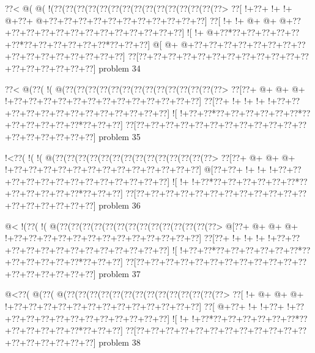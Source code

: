 \vbox{\vbox{\goo
\0??<\- @(\- @(\- !(\0??(\0??(\0??(\0??(\0??(\0??(\0??(\0??(\0??(\0??(\0??(\0??(\0??(\0??(\0??>
\0??[\- !+\0??+\- !+\- !+\- @+\0??+\- @+\0??+\0??+\0??+\0??+\0??+\0??+\0??+\0??+\0??+\0??+\0??]
\0??[\- !+\- !+\- @+\- @+\- @+\0??+\0??+\0??+\0??+\0??+\0??+\0??+\0??+\0??+\0??+\0??+\0??+\0??]
\- ![\- !+\- @+\0??*\0??+\0??+\0??+\0??+\0??+\0??*\0??+\0??+\0??+\0??+\0??+\0??*\0??+\0??+\0??]
\- @[\- @+\- @+\0??+\0??+\0??+\0??+\0??+\0??+\0??+\0??+\0??+\0??+\0??+\0??+\0??+\0??+\0??+\0??]
\0??[\0??+\0??+\0??+\0??+\0??+\0??+\0??+\0??+\0??+\0??+\0??+\0??+\0??+\0??+\0??+\0??+\0??+\0??]
}
\hfil problem 34\hfil\break
}



\vbox{\vbox{\goo
\0??<\- @(\0??(\- !(\- @(\0??(\0??(\0??(\0??(\0??(\0??(\0??(\0??(\0??(\0??(\0??(\0??(\0??(\0??>
\0??[\0??+\- @+\- @+\- @+\- !+\0??+\0??+\0??+\0??+\0??+\0??+\0??+\0??+\0??+\0??+\0??+\0??+\0??]
\0??[\0??+\- !+\- !+\- !+\- !+\0??+\0??+\0??+\0??+\0??+\0??+\0??+\0??+\0??+\0??+\0??+\0??+\0??]
\- ![\- !+\0??+\0??*\0??+\0??+\0??+\0??+\0??+\0??*\0??+\0??+\0??+\0??+\0??+\0??*\0??+\0??+\0??]
\0??[\0??+\0??+\0??+\0??+\0??+\0??+\0??+\0??+\0??+\0??+\0??+\0??+\0??+\0??+\0??+\0??+\0??+\0??]
}
\hfil problem 35\hfil\break
}



\vbox{\vbox{\goo
\- !<\0??(\- !(\- !(\- @(\0??(\0??(\0??(\0??(\0??(\0??(\0??(\0??(\0??(\0??(\0??(\0??(\0??(\0??>
\0??[\0??+\- @+\- @+\- @+\- !+\0??+\0??+\0??+\0??+\0??+\0??+\0??+\0??+\0??+\0??+\0??+\0??+\0??]
\- @[\0??+\0??+\- !+\- !+\- !+\0??+\0??+\0??+\0??+\0??+\0??+\0??+\0??+\0??+\0??+\0??+\0??+\0??]
\- ![\- !+\- !+\0??*\0??+\0??+\0??+\0??+\0??+\0??*\0??+\0??+\0??+\0??+\0??+\0??*\0??+\0??+\0??]
\0??[\0??+\0??+\0??+\0??+\0??+\0??+\0??+\0??+\0??+\0??+\0??+\0??+\0??+\0??+\0??+\0??+\0??+\0??]
}
\hfil problem 36\hfil\break
}



\vbox{\vbox{\goo
\- @<\- !(\0??(\- !(\- @(\0??(\0??(\0??(\0??(\0??(\0??(\0??(\0??(\0??(\0??(\0??(\0??(\0??(\0??>
\- @[\0??+\- @+\- @+\- @+\- !+\0??+\0??+\0??+\0??+\0??+\0??+\0??+\0??+\0??+\0??+\0??+\0??+\0??]
\0??[\0??+\- !+\- !+\- !+\- !+\0??+\0??+\0??+\0??+\0??+\0??+\0??+\0??+\0??+\0??+\0??+\0??+\0??]
\- ![\- !+\0??+\0??*\0??+\0??+\0??+\0??+\0??+\0??*\0??+\0??+\0??+\0??+\0??+\0??*\0??+\0??+\0??]
\0??[\0??+\0??+\0??+\0??+\0??+\0??+\0??+\0??+\0??+\0??+\0??+\0??+\0??+\0??+\0??+\0??+\0??+\0??]
}
\hfil problem 37\hfil\break
}



\vbox{\vbox{\goo
\- @<\0??(\- @(\0??(\- @(\0??(\0??(\0??(\0??(\0??(\0??(\0??(\0??(\0??(\0??(\0??(\0??(\0??(\0??>
\0??[\- !+\- @+\- @+\- @+\- !+\0??+\0??+\0??+\0??+\0??+\0??+\0??+\0??+\0??+\0??+\0??+\0??+\0??]
\0??[\- @+\0??+\- !+\- !+\0??+\- !+\0??+\0??+\0??+\0??+\0??+\0??+\0??+\0??+\0??+\0??+\0??+\0??]
\- ![\- !+\- !+\0??*\0??+\0??+\0??+\0??+\0??+\0??*\0??+\0??+\0??+\0??+\0??+\0??*\0??+\0??+\0??]
\0??[\0??+\0??+\0??+\0??+\0??+\0??+\0??+\0??+\0??+\0??+\0??+\0??+\0??+\0??+\0??+\0??+\0??+\0??]
}
\hfil problem 38\hfil\break
}



